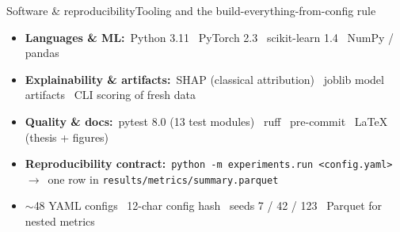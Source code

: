 \documentclass[aspectratio=169,11pt]{beamer}
\newcommand{\arr}{\ensuremath{\rightarrow}}
\begin{document}
\begin{frame}{Software \& reproducibility}{Tooling and the build-everything-from-config rule}
\begin{itemize}\itemsep4pt
  \item[\color{teal}\textbf{1.}] \textbf{Languages \& ML:}\ Python 3.11 \textperiodcentered\ PyTorch 2.3 \textperiodcentered\ scikit-learn 1.4 \textperiodcentered\ NumPy / pandas
  \item[\color{teal}\textbf{2.}] \textbf{Explainability \& artifacts:}\ SHAP (classical attribution) \textperiodcentered\ joblib model artifacts \textperiodcentered\ CLI scoring of fresh data
  \item[\color{teal}\textbf{3.}] \textbf{Quality \& docs:}\ pytest 8.0 (13 test modules) \textperiodcentered\ ruff \textperiodcentered\ pre-commit \textperiodcentered\ LaTeX (thesis + figures)
  \item[\color{teal}\textbf{4.}] \textbf{Reproducibility contract:}\ \texttt{python -m experiments.run <config.yaml>} \arr\ one row in \texttt{results/metrics/summary.parquet}
  \item[] \hspace{6mm}$\sim$48 YAML configs \textperiodcentered\ 12-char config hash \textperiodcentered\ seeds 7 / 42 / 123 \textperiodcentered\ Parquet for nested metrics
\end{itemize}
\end{frame}
\end{document}
